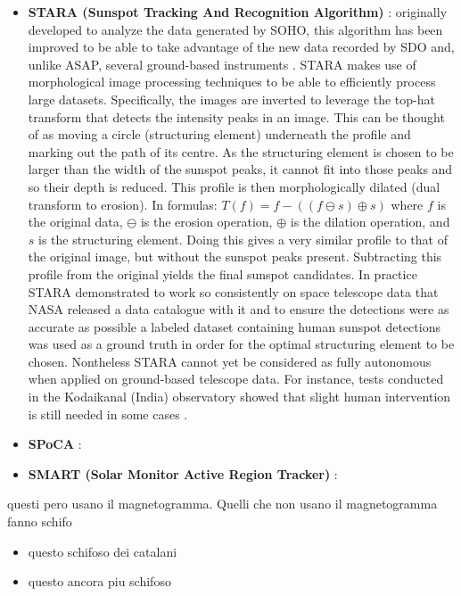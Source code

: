 \begin{itemize}
  \item \textbf{STARA (Sunspot Tracking And Recognition Algorithm)} \cite{watson2009modelling}: originally developed to analyze the data generated by SOHO, this algorithm has been improved to be able to take advantage of the new data recorded by SDO and, unlike ASAP, several ground-based instruments \cite{ravindra2013digitized}. STARA makes use of morphological image processing techniques to be able to efficiently process large datasets. Specifically, the images are inverted to leverage the top-hat transform that detects the intensity peaks in an image. This can be thought of as moving a circle (structuring element) underneath the profile and marking out the path of its centre. As the structuring element is chosen to be larger than the width of the sunspot peaks, it cannot fit into those peaks and so their depth is reduced. This profile is then morphologically dilated (dual transform to erosion).
  In formulas: $T(f) = f - ((f \ominus  s) \oplus  s)$ where $f$ is the original data, $\ominus$ is the erosion operation, $\oplus$ is the dilation operation, and $s$ is the structuring element. Doing this gives a very similar profile to that of the original image, but without the sunspot peaks present. Subtracting this profile from the original yields the final sunspot candidates. In practice STARA demonstrated to work so consistently on space telescope data that NASA released a data catalogue with it and to ensure the detections were as accurate as possible a labeled dataset containing human sunspot detections was used as a ground truth in order for the optimal structuring element to be chosen. Nontheless STARA cannot yet be considered as fully autonomous when applied on ground-based telescope data. For instance, tests conducted in the Kodaikanal (India) observatory showed that slight human intervention is still needed in some cases \cite{ravindra2013digitized}.
  \item \textbf{SPoCA} \cite{barra2009fast}:
  \item \textbf{SMART (Solar Monitor Active Region Tracker)} \cite{higgins2011solar}:
\end{itemize}
questi pero usano il magnetogramma. Quelli che non usano il magnetogramma fanno schifo
\begin{itemize}
  \item questo schifoso dei catalani \cite{curto2003automatic}
  \item questo ancora piu schifoso \cite{nguyen2005rough}
\end{itemize}

